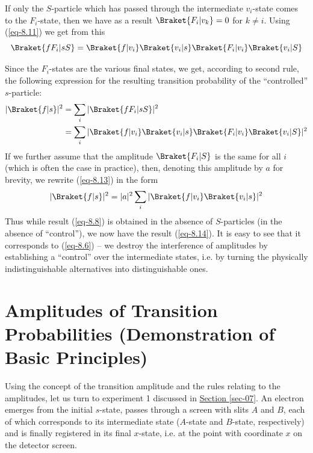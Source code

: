 \documentclass[a4paper,sfsidenotes,colorlinks=true]{tufte-book}
\numberwithin{equation}{section}
\numberwithin{figure}{section}
\begin{document}
If only the $S$-particle which has passed through the intermediate
$v_{i}$-state comes to the $F_{i}$-state, then we have as a result
$\Braket{F_{i} |v_{k}} = 0$ for $k \ne i$. Using (\ref{eq-8.11}) we
get from this
\begin{equation}%
\Braket{fF_{i}|sS} = \Braket{f|v_{i}}\Braket{v_{i}|s}\Braket{F_{i}|v_{i}}\Braket{v_{i}|S}
\label{8.12}
\end{equation}

Since the $F_{i}$-states are the various final states, we get,
according to second rule, the following expression for the resulting
transition probability of the ``controlled'' $s$-particle:
\begin{equation}%
\begin{split}
|\Braket{f|s}|^{2} & = \sum_{i} |\Braket{fF_{i}| sS}|^{2}\\
& = \sum_{i}
|\Braket{f|v_{i}}\Braket{v_{i}|s}\Braket{F_{i}|v_{i}}\Braket{v_{i}|S}
|^{2}
\end{split}
\label{eq-8.13}
\end{equation}
If we further assume that the amplitude $\Braket{F_{i} |S}$ is the
same for all $i$ (which is often the case in practice), then, denoting
this amplitude by $a$ for brevity, we rewrite (\ref{eq-8.13}) in the form
\begin{equation}%
|\Braket{f|s}|^{2} = |a|^{2} \sum_{i} |\Braket{f|v_{i}}\Braket{v_{i}|s}|^{2}
\label{eq-8.14}
\end{equation}
Thus while result (\ref{eq-8.8}) is obtained in the absence of
$S$-particles (in the absence of ``control''), we now have the result
(\ref{eq-8.14}). It is easy to see that it corresponds to (\ref{eq-8.6}) -- we destroy the interference of amplitudes by establishing a ``control'' over the intermediate states, i.e. by turning the physically indistinguishable alternatives into distinguishable ones.




\section{Amplitudes of Transition Probabilities (Demonstration of
  Basic Principles)}
\label{sec-09}



Using  the concept of the transition
amplitude and the rules relating to the amplitudes, let us turn to
experiment 1 discussed in \hyperref[sec-07]{Section \ref{sec-07}}. An
electron emerges from the initial $s$-state, passes through a screen
with slits $A$ and $B$, each of which corresponds to its intermediate
state ($A$-state and $B$-state, respectively) and is finally registered in
its final $x$-state, i.e. at the point with coordinate $x$ on the detector
screen.
\end{document}
